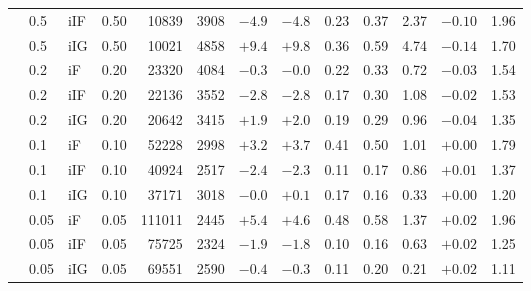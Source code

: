 \begin{tabular}{@{}lllrrrrrrrrrr@{}}
 & 0.5 & iIF & 0.50 & 10839 & 3908 & $-4.9$ & $-4.8$ & 0.23 & 0.37 & 2.37 & $-0.10$ & 1.96 \\
 & 0.5 & iIG & 0.50 & 10021 & 4858 & $+9.4$ & $+9.8$ & 0.36 & 0.59 & 4.74 & $-0.14$ & 1.70 \\
 & 0.2 & iF & 0.20 & 23320 & 4084 & $-0.3$ & $-0.0$ & 0.22 & 0.33 & 0.72 & $-0.03$ & 1.54 \\
 & 0.2 & iIF & 0.20 & 22136 & 3552 & $-2.8$ & $-2.8$ & 0.17 & 0.30 & 1.08 & $-0.02$ & 1.53 \\
 & 0.2 & iIG & 0.20 & 20642 & 3415 & $+1.9$ & $+2.0$ & 0.19 & 0.29 & 0.96 & $-0.04$ & 1.35 \\
 & 0.1 & iF & 0.10 & 52228 & 2998 & $+3.2$ & $+3.7$ & 0.41 & 0.50 & 1.01 & $+0.00$ & 1.79 \\
 & 0.1 & iIF & 0.10 & 40924 & 2517 & $-2.4$ & $-2.3$ & 0.11 & 0.17 & 0.86 & $+0.01$ & 1.37 \\
 & 0.1 & iIG & 0.10 & 37171 & 3018 & $-0.0$ & $+0.1$ & 0.17 & 0.16 & 0.33 & $+0.00$ & 1.20 \\
 & 0.05 & iF & 0.05 & 111011 & 2445 & $+5.4$ & $+4.6$ & 0.48 & 0.58 & 1.37 & $+0.02$ & 1.96 \\
 & 0.05 & iIF & 0.05 & 75725 & 2324 & $-1.9$ & $-1.8$ & 0.10 & 0.16 & 0.63 & $+0.02$ & 1.25 \\
 & 0.05 & iIG & 0.05 & 69551 & 2590 & $-0.4$ & $-0.3$ & 0.11 & 0.20 & 0.21 & $+0.02$ & 1.11 \\
\bottomrule
\end{tabular}
